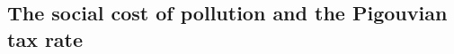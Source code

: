 \begin{comment}
content...
\paragraph{If a reduction in dirty labor share is efficient, then the aggregate production function features decreasing returns to scale in labor}
\begin{proof}
	\textit{The proof rest on the assumption that returns to scale are symmetric across dirty and clean production; either both decreasing or both are non-decreasing.}
It holds by assumption that $s_{FB,E>0}<s_{FB,E=0}$, where $E>0$ indicates that the externality is active. 
Assume by contradiction that the aggregate production function features non-decreasing returns to scale. This implies that:
\begin{align}
\left. \frp{Y}{L_F} \right|_{s_{FB,E>0}}\leq \left. \frp{Y}{L_F} \right|_{s_{FB,E=0}},\\
\left. \frp{Y}{L_G} \right|_{s_{FB,E>0}}\geq \left. \frp{Y}{L_G} \right|_{s_{FB,E=0}}.
\end{align}
When there is no externality, the efficient allocation is characterized by
\begin{align}
\left. \frp{Y}{L_F} \right|_{s_{FB,E=0}}= \left. \frp{Y}{L_G} \right|_{s_{FB,E=0}}.
\end{align}
Using the inequalities above yields
\begin{align}
\left. \frp{Y}{L_F} \right|_{s_{FB,E>0}}\leq \left. \frp{Y}{L_G} \right|_{s_{FB,E>0}}.
\end{align}
This contradicts the optimality condition which requires 
\begin{align}
\left. \frp{Y}{L_F} \right|_{s_{FB,E>0}}> \left. \frp{Y}{L_G} \right|_{s_{FB,E>0}}.
\end{align}
Hence, when a reduction in the dirty labor share is efficient, then the aggregate production function features decreasing returns to scale in both labor input goods. 
\end{proof}
\end{comment}

\subsection{The social cost of pollution and the Pigouvian tax rate}\label{app:scp}


